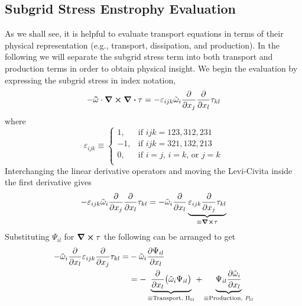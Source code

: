 \subsection{Subgrid Stress Enstrophy Evaluation}
As we shall see, it is helpful to evaluate transport equations in terms of
their physical representation (e.g., transport, dissipation, and
production). In the following we will separate the subgrid stress term into
both transport and production terms in order to obtain physical insight.
We begin the evaluation by expressing the subgrid stress in index notation,
\begin{equation}
    -\mathbf{\tilde{\omega}} \cdot \curl \div \tau =
        - \varepsilon_{ijk} \tilde{\omega}_{i} 
        \pdv{}{x_{j}} \pdv{}{x_{l}} \tau_{kl}
\end{equation}
where
\begin{equation}
    \varepsilon_{ijk} \equiv 
    \begin{cases}
        1,      &   \text{if $ijk = 123, 312, 231$}     \\
        -1,     &   \text{if $ijk = 321, 132, 213$}     \\
        0,      &   \text{if $i = j$, $i=k$, or $j=k$}  \\
    \end{cases}
    \label{eq:levi-civitas}
\end{equation}
Interchanging the linear derivative operators and moving the Levi-Civita
inside the first derivative gives
\begin{equation}
        - \varepsilon_{ijk} \tilde{\omega}_{i}  \pdv{}{x_{j}} \pdv{}{x_{l}}
        \tau_{kl} =
        - \tilde{\omega}_{i}  \pdv{}{x_{l}} \underbrace{\varepsilon_{ijk} \pdv{}{x_{j}}
        \tau_{kl}}_{\equiv \curl \mathbf{\tau}}
\end{equation}
Substituting  $\Psi_{il}$ for $\curl \mathbf{\tau}$ the following can be 
arranged to get 
\begin{equation}
    \begin{split}
        - \tilde{\omega}_{i}  \pdv{}{x_{l}} \varepsilon_{ijk} \pdv{}{x_{j}} \tau_{kl}  = &
            -\tilde{\omega}_{i} \pdv{\Psi_{il}}{x_{l}} \\
            & = - \underbrace{\pdv{}{x_{l}}\big(\tilde{\omega}_{i} \Psi_{il} \big)}_{\equiv \text{Transport, $\Pi_{\Omega}$}}
            + \underbrace{\Psi_{il} \pdv{\tilde{\omega}_{i}}{x_{l}}}_{\equiv \text{Production, $P_{\Omega}$}}
    \end{split}
    \label{eq:trans-enstrophy}
\end{equation}
